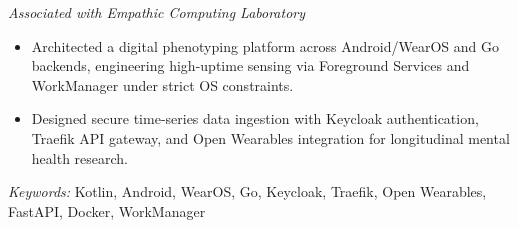 \noindent
{}

\noindent
\textit{Associated with Empathic Computing Laboratory}

\begin{itemize}
    \item Architected a digital phenotyping platform across Android/WearOS and Go backends, engineering high-uptime sensing via Foreground Services and WorkManager under strict OS constraints.
    \item Designed secure time-series data ingestion with Keycloak authentication, Traefik API gateway, and Open Wearables integration for longitudinal mental health research.
\end{itemize}

\noindent
\textit{Keywords:} Kotlin, Android, WearOS, Go, Keycloak, Traefik, Open Wearables, FastAPI, Docker, WorkManager
